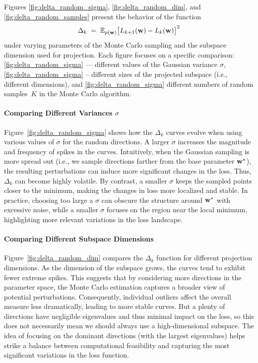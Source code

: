 \documentclass{article}
\begin{document}
Figures \ref{fig:delta_random_sigma}, \ref{fig:delta_random_dim}, and \ref{fig:delta_random_samples} present the behavior of the function
$$\Delta_k \;=\; \mathbb{E}_{p(\mathbf{w})}\bigl[L_{k+1}(\mathbf{w}) - L_k(\mathbf{w})\bigr]^2$$
under varying parameters of the Monte Carlo sampling and the subspace dimension used for projection. Each figure focuses on a 
specific comparison: \ref{fig:delta_random_sigma} --- different values of the Gaussian variance $\sigma$, 
\ref{fig:delta_random_sigma} -- different sizes of the projected subspace (i.e., different dimensions), and 
\ref{fig:delta_random_sigma} different numbers of random samples~$K$ in the Monte Carlo algorithm.

\paragraph{Comparing Different Variances \texorpdfstring{$\sigma$}{sigma}}
Figure~\ref{fig:delta_random_sigma} shows how the $\Delta_k$ curves evolve when using various values of $\sigma$ for the random 
directions. A larger $\sigma$ increases the magnitude and frequency of spikes in the curves. Intuitively, when the Gaussian sampling 
is more spread out (i.e., we sample directions farther from the base parameter $\mathbf{w}^*$), the resulting perturbations can induce more 
significant changes in the loss. Thus, $\Delta_k$ can become highly volatile. By contrast, a smaller $\sigma$ keeps the sampled points 
closer to the minimum, making the changes in loss more localized and stable. In practice, choosing too large a $\sigma$ can obscure the 
structure around $\mathbf{w}^*$ with excessive noise, while a smaller $\sigma$ focuses on the region near the local minimum, highlighting 
more relevant variations in the loss landscape.

\paragraph{Comparing Different Subspace Dimensions}
Figure~\ref{fig:delta_random_dim} compares the $\Delta_k$ function for different projection dimensions. 
As the dimension of the subspace grows, the curves tend to exhibit fewer extreme spikes. This suggests that by considering more 
directions in the parameter space, the Monte Carlo estimation captures a broader view of potential perturbations. Consequently, 
individual outliers affect the overall measure less dramatically, leading to more stable curves. 
But a plenty of directions have negligible eigenvalues and thus minimal impact on the loss, so this does not necessarily 
mean we should always use a high-dimensional subspace. The idea of focusing on the dominant directions 
(with the largest eigenvalues) helps strike a balance between computational feasibility and capturing the most significant variations 
in the loss function.
\end{document}
